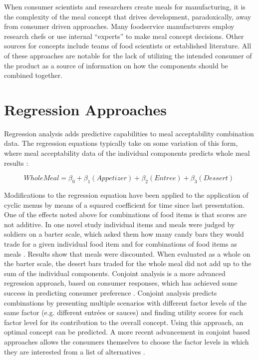 When consumer scientists and researchers create meals for manufacturing, it is the complexity of the meal concept that drives development, paradoxically, away from consumer driven approaches.   Many foodservice manufacturers employ research chefs or use internal “experts” to make meal concept decisions.  Other sources for concepts include teams of food scientists or established literature.  All of these approaches are notable for the lack of utilizing the intended consumer of the product as a source of information on how the components should be combined together.  

\section{Regression Approaches}
Regression analysis adds predictive capabilities to meal acceptability combination data. The regression equations typically take on some variation of this form, where meal acceptability data of the individual components predicts whole meal results \citep{Hedderley1995,Moskowitz1983,Turner1988}:

\begin{equation}
Whole Meal = \beta _{0} + \beta _1(Appetizer) + \beta _2(Entree) + \beta _3(Dessert)\
\nonumber
\end{equation}

Modifications to the regression equation have been applied to the application of cyclic menus by means of a squared coefficient \citep{Moskowitz1983} for time since last presentation.
One of the effects noted above for combinations of food items is that scores are not additive.  In one novel study individual items and meals were judged by soldiers on a barter scale, which asked them how many candy bars they would trade for a given individual food item and for combinations of food items as meals \citep{Lawless1994}. Results show that meals were discounted. When evaluated as a whole on the barter scale, the desert bars traded for the whole meal did not add up to the sum of the individual components. 
Conjoint analysis is a more advanced regression approach, based on consumer responses, which has achieved some success in predicting consumer preference \citep{Green1978,Luce1964}.  Conjoint analysis predicts combinations by presenting multiple scenarios with different factor levels of the same factor (e.g. different entrées or sauces) and finding utility scores for each factor level for its contribution to the overall concept.  Using this approach, an optimal concept can be predicted.  A more recent advancement in conjoint based approaches allows the consumers themselves to choose the factor levels in which they are interested from a list of alternatives \citep{Liechty2001}.


